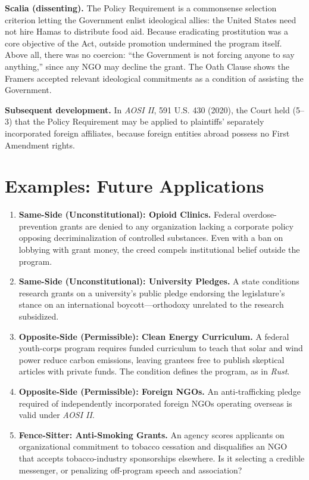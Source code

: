 \documentclass[12pt]{article}
\begin{document}
\textbf{Scalia (dissenting).} The Policy Requirement is a commonsense selection criterion letting the Government enlist ideological allies: the United States need not hire Hamas to distribute food aid. Because eradicating prostitution was a core objective of the Act, outside promotion undermined the program itself. Above all, there was no coercion: ``the Government is not forcing anyone to say anything,'' since any NGO may decline the grant. The Oath Clause shows the Framers accepted relevant ideological commitments as a condition of assisting the Government.

\textbf{Subsequent development.} In \textit{AOSI II}, 591 U.S. 430 (2020), the Court held (5--3) that the Policy Requirement may be applied to plaintiffs' separately incorporated foreign affiliates, because foreign entities abroad possess no First Amendment rights.

\section{Examples: Future Applications}

\begin{enumerate}
\item \textbf{Same-Side (Unconstitutional): Opioid Clinics.} Federal overdose-prevention grants are denied to any organization lacking a corporate policy opposing decriminalization of controlled substances. Even with a ban on lobbying with grant money, the creed compels institutional belief outside the program.
\item \textbf{Same-Side (Unconstitutional): University Pledges.} A state conditions research grants on a university's public pledge endorsing the legislature's stance on an international boycott---orthodoxy unrelated to the research subsidized.
\item \textbf{Opposite-Side (Permissible): Clean Energy Curriculum.} A federal youth-corps program requires funded curriculum to teach that solar and wind power reduce carbon emissions, leaving grantees free to publish skeptical articles with private funds. The condition defines the program, as in \textit{Rust}.
\item \textbf{Opposite-Side (Permissible): Foreign NGOs.} An anti-trafficking pledge required of independently incorporated foreign NGOs operating overseas is valid under \textit{AOSI II}.
\item \textbf{Fence-Sitter: Anti-Smoking Grants.} An agency scores applicants on organizational commitment to tobacco cessation and disqualifies an NGO that accepts tobacco-industry sponsorships elsewhere. Is it selecting a credible messenger, or penalizing off-program speech and association?
\end{enumerate}
\end{document}
